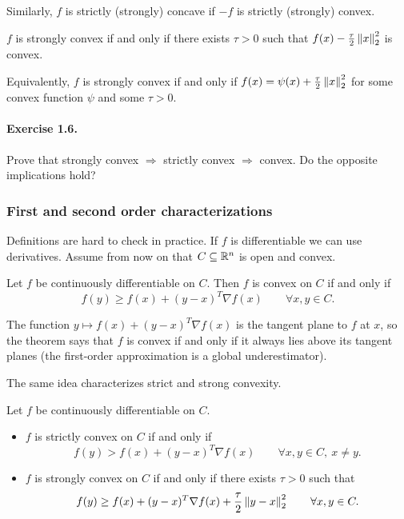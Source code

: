 \begin{remark}
Similarly, $f$ is strictly (strongly) concave if $-f$ is strictly (strongly) convex.
\end{remark}

\begin{theorem}
$f$ is strongly convex if and only if there exists $\tau > 0$ such that $f(x) - \frac{\tau}{2}\left\lVert x \right\rVert_2^2$ is convex.
\end{theorem}

\begin{remark}
Equivalently, $f$ is strongly convex if and only if $f(x) = \psi(x) + \frac{\tau}{2}\left\lVert x \right\rVert_2^2$ for some convex function $\psi$ and some $\tau > 0$.
\end{remark}

\paragraph{Exercise 1.6.} Prove that strongly convex $\Rightarrow$ strictly convex $\Rightarrow$ convex. Do the opposite implications hold?

\subsubsection{First and second order characterizations}

Definitions are hard to check in practice. If $f$ is differentiable we can use derivatives. Assume from now on that $C \subseteq \mathbb{R}^n$ is open and convex.

\begin{theorem}
Let $f$ be continuously differentiable on $C$. Then $f$ is convex on $C$ if and only if
\[
    f(y) \ge f(x) + (y-x)^T \nabla f(x) \qquad \forall x,y \in C.
\]
\end{theorem}

The function $y \mapsto f(x) + (y-x)^T\nabla f(x)$ is the tangent plane to $f$ at $x$, so the theorem says that $f$ is convex if and only if it always lies above its tangent planes (the first-order approximation is a global underestimator).

The same idea characterizes strict and strong convexity.

\begin{theorem}
Let $f$ be continuously differentiable on $C$.
\begin{itemize}
    \item $f$ is strictly convex on $C$ if and only if
    \[
        f(y) > f(x) + (y-x)^T \nabla f(x) \qquad \forall x,y \in C,\ x \ne y.
    \]
    \item $f$ is strongly convex on $C$ if and only if there exists $\tau > 0$ such that
    \[
        f(y) \ge f(x) + (y-x)^T \nabla f(x) + \frac{\tau}{2}\left\lVert y-x \right\rVert_2^2 \qquad \forall x,y \in C.
    \]
\end{itemize}
\end{theorem}

